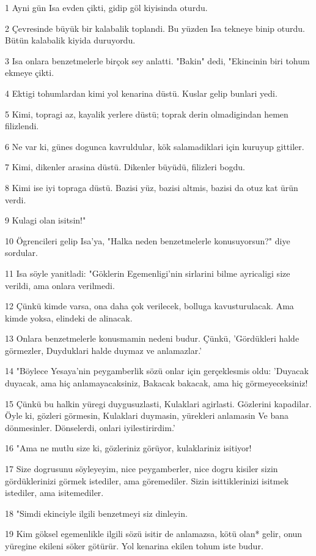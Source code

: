 \par 1 Ayni gün Isa evden çikti, gidip göl kiyisinda oturdu.
\par 2 Çevresinde büyük bir kalabalik toplandi. Bu yüzden Isa tekneye binip oturdu. Bütün kalabalik kiyida duruyordu.
\par 3 Isa onlara benzetmelerle birçok sey anlatti. "Bakin" dedi, "Ekincinin biri tohum ekmeye çikti.
\par 4 Ektigi tohumlardan kimi yol kenarina düstü. Kuslar gelip bunlari yedi.
\par 5 Kimi, topragi az, kayalik yerlere düstü; toprak derin olmadigindan hemen filizlendi.
\par 6 Ne var ki, günes dogunca kavruldular, kök salamadiklari için kuruyup gittiler.
\par 7 Kimi, dikenler arasina düstü. Dikenler büyüdü, filizleri bogdu.
\par 8 Kimi ise iyi topraga düstü. Bazisi yüz, bazisi altmis, bazisi da otuz kat ürün verdi.
\par 9 Kulagi olan isitsin!"
\par 10 Ögrencileri gelip Isa'ya, "Halka neden benzetmelerle konusuyorsun?" diye sordular.
\par 11 Isa söyle yanitladi: "Göklerin Egemenligi'nin sirlarini bilme ayricaligi size verildi, ama onlara verilmedi.
\par 12 Çünkü kimde varsa, ona daha çok verilecek, bolluga kavusturulacak. Ama kimde yoksa, elindeki de alinacak.
\par 13 Onlara benzetmelerle konusmamin nedeni budur. Çünkü, 'Gördükleri halde görmezler, Duyduklari halde duymaz ve anlamazlar.'
\par 14 "Böylece Yesaya'nin peygamberlik sözü onlar için gerçeklesmis oldu: 'Duyacak duyacak, ama hiç anlamayacaksiniz, Bakacak bakacak, ama hiç görmeyeceksiniz!
\par 15 Çünkü bu halkin yüregi duygusuzlasti, Kulaklari agirlasti. Gözlerini kapadilar. Öyle ki, gözleri görmesin, Kulaklari duymasin, yürekleri anlamasin Ve bana dönmesinler. Dönselerdi, onlari iyilestirirdim.'
\par 16 "Ama ne mutlu size ki, gözleriniz görüyor, kulaklariniz isitiyor!
\par 17 Size dogrusunu söyleyeyim, nice peygamberler, nice dogru kisiler sizin gördüklerinizi görmek istediler, ama göremediler. Sizin isittiklerinizi isitmek istediler, ama isitemediler.
\par 18 "Simdi ekinciyle ilgili benzetmeyi siz dinleyin.
\par 19 Kim göksel egemenlikle ilgili sözü isitir de anlamazsa, kötü olan* gelir, onun yüregine ekileni söker götürür. Yol kenarina ekilen tohum iste budur.
